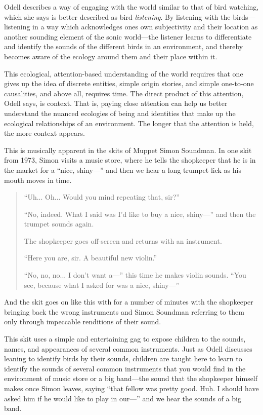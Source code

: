 \documentclass[12pt,letterpaper]{article}
\begin{document}
	Odell describes a way of engaging with the 
	world similar to that of bird watching, which she says is better 
	described as bird \textit{listening}.
	By listening with the birds---listening in a way which acknowledges
	ones own subjectivity and their location as another sounding element of
	the sonic world---the listener learns to differentiate and identify 
	the sounds 
	of the different birds in an environment, and thereby becomes aware
	of the ecology around them and their place within 
	it.\autocite[33/366]{Odell} 

	
	This ecological, attention-based understanding of the world requires 
	that one gives up the idea of discrete entities, simple origin stories,
	and simple one-to-one causalities, and above all, requires time.
	The direct product of this attention, Odell says, is context. 
	That is, paying close attention can help us better understand the 
	nuanced ecologies of being and identities that make up the ecological
	relationships of an environment. The longer that the attention is held, 
	the more context appears.\autocite[155]{Odell} 

	This is musically apparent in the skits of Muppet Simon Soundman.
	In one skit from 1973,\autocite{0458} Simon visits a music store, where
	he tells the shopkeeper
	that he is in the market for a ``nice, shiny---'' and then we hear a
	long trumpet lick as his mouth moves in time. 

	\begin{quote}

	``Uh... Oh... Would you mind repeating that, sir?''

	``No, indeed. What I said was I'd like to buy a nice, shiny---'' and
	then the trumpet sounds again. 

	The shopkeeper goes off-screen and returns with an instrument. 
	 
	``Here you are, sir. A beautiful new violin.''

	``No, no, no... I don't want a---'' this time he makes violin
	sounds.  ``You see, because what I asked for was a nice, shiny---''
	
	\end{quote}
	
	And the skit goes on like this with for a number of minutes with the 
	shopkeeper bringing back the wrong instruments and Simon Soundman
	referring to them only through impeccable renditions of their sound. 
	
	This skit uses a simple and entertaining gag to expose children to the
	sounds, names, and appearances of several common instruments. Just as 
	Odell
	discusses leaning to identify birds by their sounds, children are	
	taught here to learn to identify the sounds of several common 
	instruments that you would find in the environment of music store or 
	a big band---the sound that the shopkeeper himself makes once Simon
	leaves, saying ``that fellow was pretty good. Huh. I should have asked
	him if he would like to play in our---'' and we hear the sounds of a
	big band.  
\end{document}
